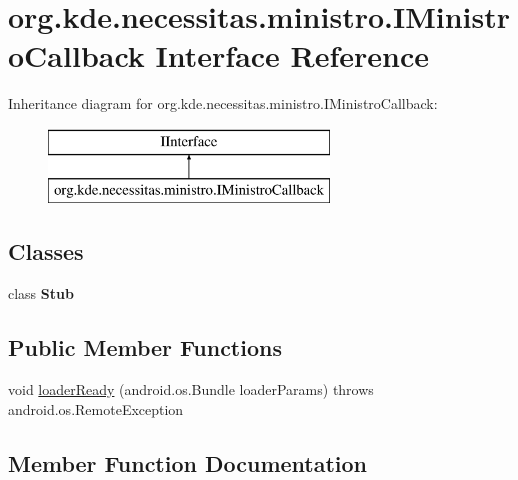 \hypertarget{interfaceorg_1_1kde_1_1necessitas_1_1ministro_1_1_i_ministro_callback}{}\section{org.\+kde.\+necessitas.\+ministro.\+I\+Ministro\+Callback Interface Reference}
\label{interfaceorg_1_1kde_1_1necessitas_1_1ministro_1_1_i_ministro_callback}
Inheritance diagram for org.\+kde.\+necessitas.\+ministro.\+I\+Ministro\+Callback\+:\begin{figure}[H]
\begin{center}
\leavevmode
\includegraphics[height=2.000000cm]{interfaceorg_1_1kde_1_1necessitas_1_1ministro_1_1_i_ministro_callback}
\end{center}
\end{figure}
\subsection*{Classes}
\begin{DoxyCompactItemize}
\item 
class {\bfseries Stub}
\end{DoxyCompactItemize}
\subsection*{Public Member Functions}
\begin{DoxyCompactItemize}
\item 
void \hyperlink{interfaceorg_1_1kde_1_1necessitas_1_1ministro_1_1_i_ministro_callback_ac67b08ed6184a57c5c732f2f8911a3bf}{loader\+Ready} (android.\+os.\+Bundle loader\+Params)  throws android.\+os.\+Remote\+Exception
\end{DoxyCompactItemize}


\subsection{Member Function Documentation}
\mbox{\label{interfaceorg_1_1kde_1_1necessitas_1_1ministro_1_1_i_ministro_callback_ac67b08ed6184a57c5c732f2f8911a3bf}} 

